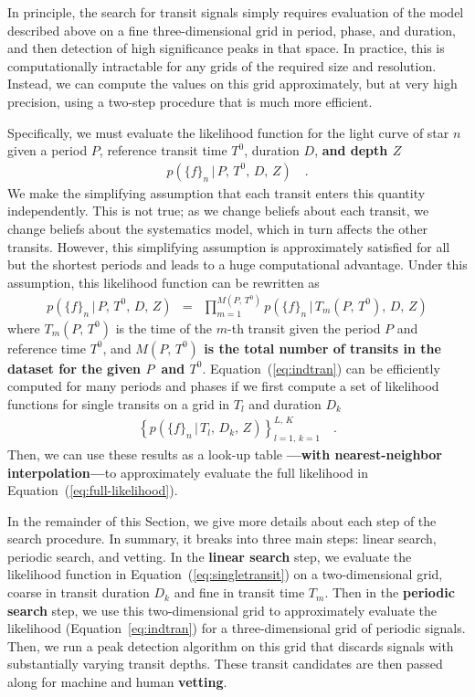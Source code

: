 \documentclass[12pt,preprint]{aastex}
\newcommand{\Eq}[1]{Equation~(\ref{eq:#1})}
\newcommand{\eq}[1]{\Eq{#1}}
\newcommand{\eqalt}[1]{Equation~\ref{eq:#1}}
\newcommand{\eqlabel}[1]{\label{eq:#1}}
\newcommand{\sectionname}{Section}
\newcommand{\response}[1]{{\color{mygreen} {\bf #1}}}
\newcommand{\flux}{{\ensuremath{f}}}
\newcommand{\period}{{\ensuremath{P}}}
\newcommand{\phase}{{\ensuremath{T^0}}}
\newcommand{\duration}{{\ensuremath{D}}}
\newcommand{\depth}{{\ensuremath{Z}}}
\newcommand{\transittime}{{\ensuremath{T}}}
\begin{document}
In principle, the search for transit signals simply requires evaluation of the
model described above on a fine three-dimensional grid in period, phase, and
duration, and then detection of high significance peaks in that space.
In practice, this is computationally intractable for any grids of the
required size and resolution.
Instead, we can compute the values on this grid approximately, but at very
high precision, using a two-step procedure that is much more efficient.

Specifically, we must evaluate the likelihood function for the light curve of
star $n$ given a period \period, reference transit time \phase, duration
\duration, \response{and depth \depth}
\begin{eqnarray}\eqlabel{full-likelihood}
p(\{\flux\}_n\,|\,\period,\,\phase,\,\duration,\,\depth) \quad.
\end{eqnarray}
We make the simplifying assumption that each transit enters this quantity
independently.
This is not true; as we change beliefs about each transit, we change beliefs
about the systematics model, which in turn affects the other transits.
However, this simplifying assumption
is approximately satisfied for all but the shortest
periods and leads to a huge computational advantage.
Under this assumption, this likelihood function can be rewritten as
\begin{eqnarray}\eqlabel{indtran}
p(\{\flux\}_n\,|\,\period,\,\phase,\,\duration,\,\depth) &=&
\prod_{m=1}^{M(\period,\,\phase)}
    p(\{\flux\}_n\,|\,\transittime_m(\period,\,\phase),\,\duration,\,
                    \depth)
\end{eqnarray}
where $\transittime_m(\period,\,\phase)$ is the time of the $m$-th
transit given the period $\period$ and reference time $\phase$, and
\response{$M(\period,\,\phase)$ is the total number of transits in the dataset
for the given \period\ and \phase}.
\Eq{indtran} can be efficiently computed for many periods and phases if we
first compute a set of likelihood functions for single transits on a grid
in $\transittime_l$ and duration $\duration_k$
\begin{eqnarray}\eqlabel{singletransit}
\left \{ p(\{\flux\}_n\,|\,\transittime_l,\,\duration_k,\,\depth)
\right\}_{l=1,\,k=1}^{L,\,K} \quad.
\end{eqnarray}
Then, we can use these results as a look-up table\response{---with
nearest-neighbor interpolation---}to approximately evaluate the full
likelihood in \eq{full-likelihood}.

In the remainder of this \sectionname, we give more details about each step of
the search procedure.
In summary, it breaks into three main steps: linear
search, periodic search, and vetting.
In the {\bf linear search} step, we evaluate the likelihood function in
\eq{singletransit} on a two-dimensional grid, coarse in transit duration
$\duration_k$ and fine in transit time $\transittime_m$.
Then in the {\bf periodic search} step, we use this two-dimensional grid to
approximately evaluate the likelihood (\eqalt{indtran}) for a
three-dimensional grid of periodic signals.
Then, we run a peak detection algorithm on this grid that discards signals
with substantially varying transit depths.
These transit candidates are then passed along for machine and human {\bf
vetting}.
\end{document}

